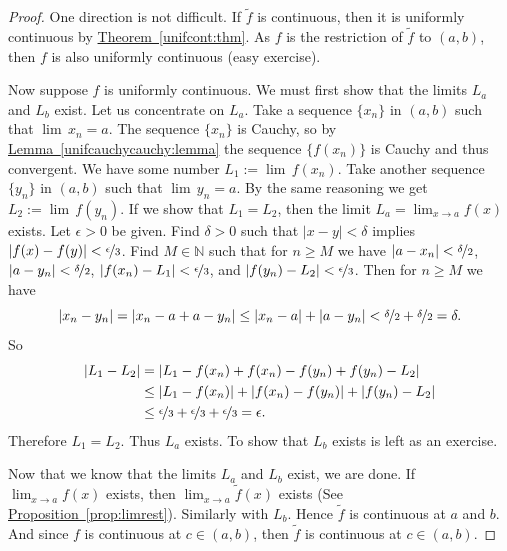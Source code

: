 \documentclass[12pt]{book}
\newcommand{\abs}[1]{\left\lvert {#1} \right\rvert}
\newcommand{\N}{{\mathbb{N}}}
\theoremstyle{plain}
\theoremstyle{remark}
\theoremstyle{definition}
\theoremstyle{exercise}
\theoremstyle{example}
\newcommand{\thmref}[1]{\hyperref[#1]{Theorem~\ref*{#1}}}
\newcommand{\propref}[1]{\hyperref[#1]{Proposition~\ref*{#1}}}
\newcommand{\lemmaref}[1]{\hyperref[#1]{Lemma~\ref*{#1}}}
\begin{document}
\begin{proof}
One direction is not difficult.  If $\widetilde{f}$ is continuous, then
it is uniformly continuous by \thmref{unifcont:thm}.  As $f$ is the
restriction of $\widetilde{f}$ to $(a,b)$, then $f$ is also uniformly continuous
(easy exercise).

Now suppose $f$ is uniformly continuous.  We must first show
that the limits $L_a$ and $L_b$ exist.  Let us concentrate on $L_a$.
Take a sequence $\{ x_n \}$ in $(a,b)$ such that $\lim\, x_n = a$.
The sequence $\{ x_n \}$ is Cauchy, so by
\lemmaref{unifcauchycauchy:lemma}
the sequence $\{ f(x_n) \}$ is Cauchy and thus convergent.
We have some number $L_1 := \lim\, f(x_n)$.  Take another sequence
$\{ y_n \}$ in $(a,b)$ such that $\lim\, y_n = a$.  By the same reasoning
we get $L_2 := \lim\, f(y_n)$.  If we show that $L_1 = L_2$, then
the limit $L_a = \lim_{x\to a} f(x)$ exists.  Let $\epsilon > 0$ be given.
Find $\delta > 0$ such that $\abs{x-y} < \delta$ implies $\abs{f(x)-f(y)} <
\nicefrac{\epsilon}{3}$.  Find $M \in \N$ such that for
$n \geq M$ we have $\abs{a-x_n} < \nicefrac{\delta}{2}$,
$\abs{a-y_n} < \nicefrac{\delta}{2}$,
$\abs{f(x_n)-L_1} < \nicefrac{\epsilon}{3}$, and
$\abs{f(y_n)-L_2} < \nicefrac{\epsilon}{3}$.  Then for $n \geq M$ we have
\begin{equation*}
\abs{x_n-y_n} = 
\abs{x_n-a+a-y_n} \leq
\abs{x_n-a}+\abs{a-y_n} < \nicefrac{\delta}{2} + \nicefrac{\delta}{2} =
\delta.
\end{equation*}
So
\begin{equation*}
\begin{split}
\abs{L_1-L_2} &=
\abs{L_1-f(x_n)+f(x_n)-f(y_n)+f(y_n)-L_2} \\
& \leq 
\abs{L_1-f(x_n)}+\abs{f(x_n)-f(y_n)}+\abs{f(y_n)-L_2} \\
& \leq
\nicefrac{\epsilon}{3} + \nicefrac{\epsilon}{3} + \nicefrac{\epsilon}{3}
=
\epsilon .
\end{split}
\end{equation*}
Therefore $L_1 = L_2$.
Thus $L_a$ exists.  To show that $L_b$ exists is left as an exercise.

Now that we know that the
limits $L_a$ and $L_b$ exist, we are done.  If $\lim_{x\to a} f(x)$
exists, then $\lim_{x\to a} \widetilde{f}(x)$ exists
(See \propref{prop:limrest}).  Similarly with $L_b$.
Hence $\widetilde{f}$ is continuous at $a$ and $b$.  
And since $f$ is continuous at $c \in (a,b)$, then
$\widetilde{f}$ is continuous at $c \in (a,b)$.
\end{proof}
\end{document}
